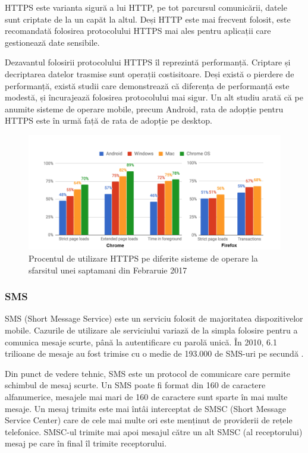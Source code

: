 \documentclass[12pt]{article}
\begin{document}
HTTPS este varianta sigură a lui HTTP, pe tot parcursul comunicării, datele sunt criptate de la un capăt la altul.
Deși HTTP este mai frecvent folosit, este recomandată folosirea protocolului HTTPS mai ales pentru aplicații 
care gestionează date sensibile.

Dezavantul folosirii protocolului HTTPS îl reprezintă performanță. Criptare și decriptarea datelor trasmise sunt
operații costisitoare. Deși există o pierdere de performanță, există studii \cite{goldberg1998comparison} care demonstrează
că diferența de performanță este modestă, și încurajează folosirea protocolului mai sigur. Un alt studiu \cite{felt2017measuring}
arată că pe anumite sisteme de operare mobile, precum Android, rata de adopție pentru HTTPS este în urmă față de rata de adopție
pe desktop. 

\begin{figure}[H]
\centering
\includegraphics{http.png}
\caption{Procentul de utilizare HTTPS pe diferite sisteme de operare la sfarsitul unei saptamani din
Febraruie 2017 \cite{felt2017measuring}}
\end{figure}

\subsubsection{SMS}

SMS (Short Message Service) este un serviciu folosit de majoritatea dispozitivelor mobile. Cazurile de 
utilizare ale serviciului variază de la simpla folosire pentru a comunica mesaje scurte, până la 
autentificare cu parolă unică. În 2010, 6.1 trilioane de mesaje au fost trimise cu o medie de 193.000 de SMS-uri
pe secundă \cite{riseof3g}. 


Din punct de vedere tehnic, SMS este un protocol de comunicare care permite schimbul de mesaj scurte. Un SMS 
poate fi format din 160 de caractere alfanumerice, mesajele mai mari de 160 de caractere sunt sparte în 
mai multe mesaje. 
Un mesaj trimits este mai întâi interceptat de SMSC (Short Message Service Center) care de cele mai multe ori
este menținut de providerii de rețele telefonice. SMSC-ul trimite mai apoi mesajul către un alt SMSC (al receptorului)
mesaj pe care în final îl trimite receptorului.
\end{document}
